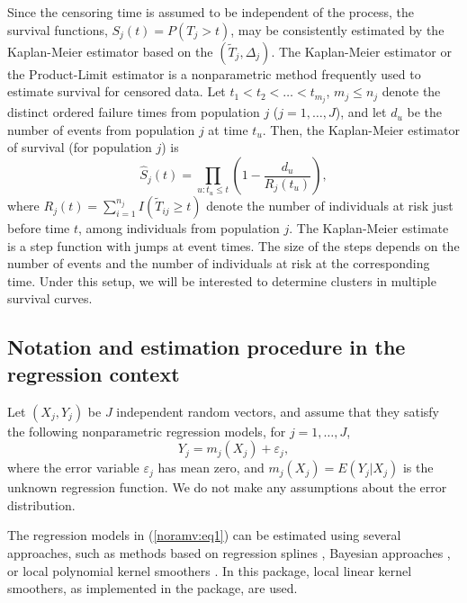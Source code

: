 Since the censoring time is assumed to be independent of the process, the survival functions, $S_j(t) = P(T_j > t)$, may be consistently estimated by the Kaplan-Meier estimator \citep{KM58} based on the $(\widetilde T_j,\Delta_j)$. The Kaplan-Meier estimator or the Product-Limit estimator is a nonparametric method frequently used to estimate survival for censored data. Let $t_1<t_2< \ldots <t_{m_j}$, $m_j \leq n_j$ denote the distinct ordered failure times from population $j$ ($j=1,\ldots, J$), and let $d_u$ be the number of events from population $j$ at time $t_u$. Then, the Kaplan-Meier estimator of survival (for population $j$) is 
\[\widehat S_j(t) = \prod_{u:t_u\leq t} \left(1-\frac{d_u}{R_j(t_u)}\right),\] 
\noindent where $R_j(t)=\sum_{i=1}^{n_j}I(\widetilde T_{ij} \geq t)$ denote the number of individuals at risk just before time $t$, among individuals from population $j$. The Kaplan-Meier estimate is a step function with jumps at event times. The size of the steps depends on the number of events and the number of individuals at risk at the corresponding time. Under this setup, we will be interested to determine clusters in multiple survival curves.





\subsection{Notation and estimation procedure in the regression context}
\label{nmvillanueva:regalgorithm}




Let $(X_j,Y_j)$ be $J$ independent random vectors, and assume that they satisfy the following nonparametric regression models,  for $j=1,\ldots,J$,
\begin{equation} 
Y_j=m_j(X_j) + \varepsilon_j,
\label{noramv:eq1}  
\end{equation}
where the  error variable $\varepsilon_j$ has  mean zero, and $m_j(X_j)= E(Y_j|X_j)$ is the unknown regression function. We do not make any assumptions about the error distribution.

 The  regression models in (\ref {noramv:eq1}) can be estimated using several approaches, such as methods based on regression splines \citep{deboor}, Bayesian approaches \citep{Lang04}, or local  polynomial kernel smoothers \citep{NoRefWorks:7,GVK19282144X}.  In this package, local  linear kernel smoothers, as implemented in the  package, are used. 
 

